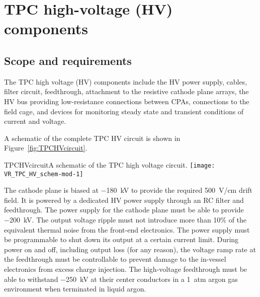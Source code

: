 




\section{TPC high-voltage (HV) components}

\subsection{Scope and requirements}

The TPC high voltage (HV) components include the HV power supply, cables,
filter circuit, feedthrough, attachment to the resistive cathode plane
arrays, the HV bus providing low-resistance connections between CPAs,
connections to the field cage, and devices for monitoring steady state
and transient conditions of current and voltage.

A schematic of the complete TPC HV circuit is shown in Figure~\ref{fig:TPCHVcircuit}.

\begin{cdrfigure}{TPCHVcircuit}{A schematic of the TPC high voltage circuit.}
  \texttt{[image: VR\_TPC\_HV\_schem-mod-1]}
\end{cdrfigure}


The cathode plane is biased at \SI{-180}{kV} to provide the
required \SI{500}{V/cm} drift field.  It is 
powered by a dedicated HV power supply through an RC filter and
feedthrough.  The power supply for the cathode plane must be able
to provide \SI{-200}{kV}.  The output voltage
ripple must not introduce more than 10\% %
of the equivalent thermal
noise from the front-end electronics. The power supply must be
programmable to shut down its output at a certain current
limit. During power on and off, including output loss (for any
reason), the voltage ramp rate at the feedthrough must be controllable
to prevent damage to the in-vessel electronics from excess charge
injection. The high-voltage feedthrough must be able to withstand \SI{-250}{kV}
at their center conductors in a \SI{1}{atm} argon gas environment when
terminated in liquid argon.

